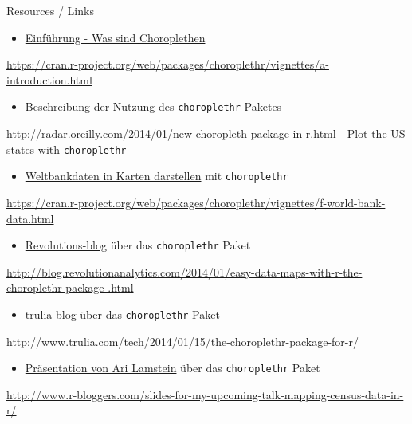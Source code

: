 \documentclass[ignorenonframetext,]{beamer}
\providecommand{\tightlist}{%
  \setlength{\itemsep}{0pt}\setlength{\parskip}{0pt}}
\begin{document}
\begin{frame}[fragile]{Resources / Links}
\protect\hypertarget{resources-links}{}

\begin{itemize}
\tightlist
\item
  \href{https://cran.r-project.org/web/packages/choroplethr/vignettes/a-introduction.html}{Einführung
  - Was sind Choroplethen}
\end{itemize}

\url{https://cran.r-project.org/web/packages/choroplethr/vignettes/a-introduction.html}

\begin{itemize}
\tightlist
\item
  \href{http://radar.oreilly.com/2014/01/new-choropleth-package-in-r.html}{Beschreibung}
  der Nutzung des \texttt{choroplethr} Paketes
\end{itemize}

\url{http://radar.oreilly.com/2014/01/new-choropleth-package-in-r.html}
- Plot the
\href{https://cran.r-project.org/web/packages/choroplethr/vignettes/b-state-choropleth.html}{US
states} with \texttt{choroplethr}

\begin{itemize}
\tightlist
\item
  \href{https://cran.r-project.org/web/packages/choroplethr/vignettes/f-world-bank-data.html}{Weltbankdaten
  in Karten darstellen} mit \texttt{choroplethr}
\end{itemize}

\url{https://cran.r-project.org/web/packages/choroplethr/vignettes/f-world-bank-data.html}

\begin{itemize}
\tightlist
\item
  \href{http://blog.revolutionanalytics.com/2014/01/easy-data-maps-with-r-the-choroplethr-package-.html}{Revolutions-blog}
  über das \texttt{choroplethr} Paket
\end{itemize}

\url{http://blog.revolutionanalytics.com/2014/01/easy-data-maps-with-r-the-choroplethr-package-.html}

\begin{itemize}
\tightlist
\item
  \href{http://www.trulia.com/tech/2014/01/15/the-choroplethr-package-for-r/}{trulia}-blog
  über das \texttt{choroplethr} Paket
\end{itemize}

\url{http://www.trulia.com/tech/2014/01/15/the-choroplethr-package-for-r/}

\begin{itemize}
\tightlist
\item
  \href{http://www.r-bloggers.com/slides-for-my-upcoming-talk-mapping-census-data-in-r/}{Präsentation
  von Ari Lamstein} über das \texttt{choroplethr} Paket
\end{itemize}

\url{http://www.r-bloggers.com/slides-for-my-upcoming-talk-mapping-census-data-in-r/}

\end{frame}
\end{document}
